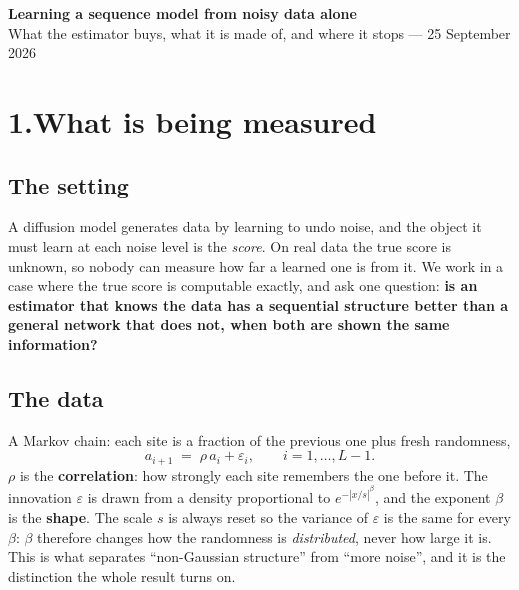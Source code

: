 \documentclass[10pt,a4paper]{article}
\newcommand{\corr}{\rho}
\newcommand{\nsites}{L}
\begin{document}
\pagestyle{empty}

\begin{center}
{\Large\bfseries Learning a sequence model from noisy data alone}\\[0.2em]
{\normalsize What the estimator buys, what it is made of, and where it stops --- 25 September 2026}
\end{center}

\section*{1.\quad What is being measured}

\subsection{The setting} A diffusion model generates data by learning to undo noise, and the
object it must learn at each noise level is the \emph{score}. On real data the true score is
unknown, so nobody can measure how far a learned one is from it. We work in a case where the true
score is computable exactly, and ask one question: \textbf{is an estimator that knows the data has
a sequential structure better than a general network that does not, when both are shown the same
information?}

\subsection{The data} A Markov chain: each site is a fraction of the previous one plus fresh
randomness,
\[
a_{i+1} \;=\; \corr\,a_i + \varepsilon_i ,\qquad i = 1,\dots,\nsites-1 .
\]
$\corr$ is the \textbf{correlation}: how strongly each site remembers the one before it. The
innovation $\varepsilon$ is drawn from a density proportional to $e^{-|x/s|^{\beta}}$, and the
exponent $\beta$ is the \textbf{shape}. The scale $s$ is always reset so the variance of
$\varepsilon$ is the same for every $\beta$: $\beta$ therefore changes how the randomness is
\emph{distributed}, never how large it is. This is what separates ``non-Gaussian structure'' from
``more noise'', and it is the distinction the whole result turns on.
\end{document}
